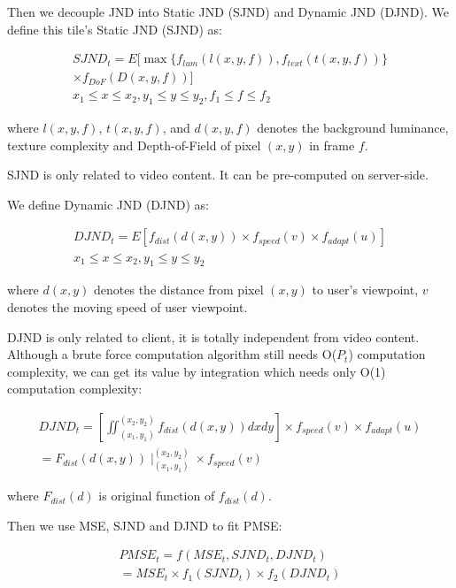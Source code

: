 Then we decouple JND into Static JND (SJND) and Dynamic JND (DJND). We define this tile's Static JND (SJND) as:

\begin{equation}
\begin{aligned}
SJND_t = E[\max \{ f_{lum}(l(x, y, f)) , f_{text}(t(x, y, f))\} \\
\times f_{DoF}(D(x, y, f))] \\
 x_1 \le x \le x_2 , y_1 \le y \le y_2 , f_1 \le f \le f_2
\end{aligned}
\end{equation}

where $l(x, y, f)$, $t(x, y, f)$, and $d(x, y, f)$ denotes the background luminance, texture complexity and Depth-of-Field of pixel $(x, y)$ in frame $f$.

SJND is only related to video content. It can be pre-computed on server-side.

We define Dynamic JND (DJND) as:

\begin{equation}
\begin{aligned}
DJND_t =  E[f_{dist}(d(x, y)) \times f_{speed}(v) \times f_{adapt}(u)] \\
 x_1 \le x \le x_2 , y_1 \le y \le y_2
\end{aligned}
\end{equation}

where $d(x, y)$ denotes the distance from pixel $(x, y)$ to user's viewpoint, $v$ denotes the moving speed of user viewpoint.

DJND is only related to client, it is totally independent from video content. Although a brute force computation algorithm still needs O($P_t$) computation complexity, we can get its value by integration which needs only O(1) computation complexity:

\begin{equation}
\begin{aligned}
DJND_t = [\iint_{(x_1, y_1)}^{(x_2, y_2)} f_{dist}(d(x, y)) dx dy] \times f_{speed}(v) \times f_{adapt}(u)\\
= F_{dist}(d(x, y)) \mid_{(x_1, y_1)}^{(x_2, y_2)} \times f_{speed}(v)
\end{aligned}
\end{equation}

where $F_{dist}(d)$ is original function of $f_{dist}(d)$.

Then we use MSE, SJND and DJND to fit PMSE:

\begin{equation}
\begin{aligned}
PMSE_t = f(MSE_t, SJND_t, DJND_t) \\
= MSE_t \times f_1(SJND_t) \times f_2(DJND_t)
\end{aligned}
\end{equation}

